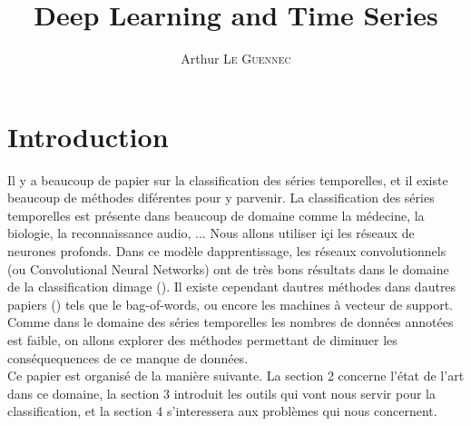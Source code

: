 \documentclass[11pt]{sdm}
\title{Deep Learning and Time Series}
\author{Arthur \textsc{Le Guennec}}
\begin{document}
\maketitle


\section{Introduction}

Il y a beaucoup de papier sur la classification des s\'eries temporelles, et il existe beaucoup de m\'ethodes dif\'erentes pour y parvenir. La classification des s\'eries temporelles est pr\'esente dans beaucoup de domaine comme la m\'edecine, la biologie, la reconnaissance audio, ... Nous allons utiliser i\c ci les r\'eseaux de neurones profonds. Dans ce mod\`ele d\textquotesingle apprentissage, les r\'eseaux convolutionnels (ou Convolutional Neural Networks) ont de tr\`es bons r\'esultats dans le domaine de la classification d\textquotesingle image (\cite{chatfield2014return}). Il existe cependant d\textquotesingle autres m\'ethodes dans d\textquotesingle autres papiers (\cite{bailly2015bag}) tels que le bag-of-words, ou encore les machines \`a vecteur de support.
Comme dans le domaine des s\'eries temporelles les nombres de donn\'ees annot\'ees est faible, on allons explorer des m\'ethodes permettant de diminuer les cons\'equequences de ce manque de donn\'ees. \\
Ce papier est organis\'e de la mani\`ere suivante. La section 2 concerne l'\'etat de l'art dans ce domaine, la section 3 introduit les outils qui vont nous servir pour la classification, et la section 4 s'interessera aux probl\`emes qui nous concernent.

 
\end{document}
